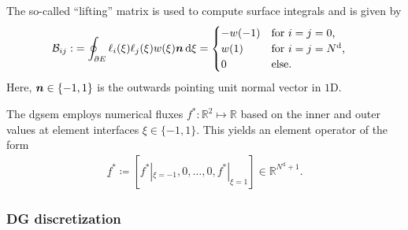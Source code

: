 The so-called ``lifting'' matrix is used to compute surface integrals and is given by
\begin{align}
\label{eq:operator_lifting_matrix}
\mathcal{B}_{ij} :&= \oint_{\partial E} \ell_i(\xi) \ell_j(\xi) w(\xi) \text{\boldmath$n$} \,\mathrm{d}\xi
=
\begin{cases}
- w(-1) & \text{for $i=j=0$,} \\
w(1) & \text{for $i=j={N^\mathrm{d}}$,} \\
0 & \text{else.}
\end{cases}
\end{align}
Here, $\text{\boldmath$n$} \in \{-1, 1\}$ is the outwards pointing unit normal vector in $1$D.

The \gls{dgsem} employs numerical fluxes $f^*\colon \mathbb{R}^2\mapsto \mathbb{R}$ based on the inner and outer values at element interfaces $\xi \in \{-1,1\}$.
This yields an element operator of the form
\begin{align}
\label{eq:operator_numerical_flux_vector}
\underline{f}^* \coloneq \left[f^*|_{\xi=-1}, 0, \dots, 0, f^*|_{\xi=1}\right] \in\mathbb{R}^{N^\mathrm{d}+1}.
\end{align}


\subsubsection{DG discretization}
\label{sec:dg_discretization}

